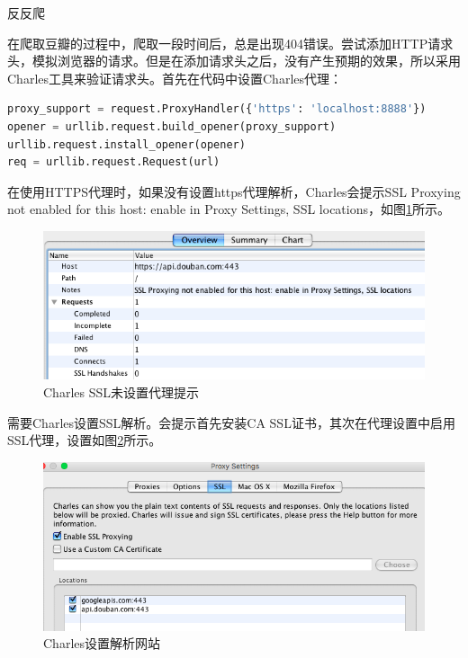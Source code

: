\documentclass[8pt]{book}
\makeatletter
\numberwithin{dummy}{section}
\theoremstyle{ocrenumbox}
\theoremstyle{blacknumex}
\theoremstyle{blacknumbox}
\theoremstyle{ocrenum}
\renewcommand{\subsection}{\@startsection {subsection}{2}{\z@}
	{-3ex \@plus -0.1ex \@minus -.4ex}
	{0.5ex \@plus.2ex }
	{\normalfont\sffamily\bfseries}}
\newlength\esp
\makeatother
\begin{document}
\subsection{反反爬}

在爬取豆瓣的过程中，爬取一段时间后，总是出现404错误。尝试添加HTTP请求头，模拟浏览器的请求。但是在添加请求头之后，没有产生预期的效果，所以采用Charles工具来验证请求头。首先在代码中设置Charles代理：

\begin{lstlisting}[language=Python]
proxy_support = request.ProxyHandler({'https': 'localhost:8888'})
opener = urllib.request.build_opener(proxy_support)
urllib.request.install_opener(opener)
req = urllib.request.Request(url)
\end{lstlisting}

在使用HTTPS代理时，如果没有设置https代理解析，Charles会提示SSL Proxying not enabled for this host: enable in Proxy Settings, SSL locations，如图\ref{fig:charlesssltips}所示。

\begin{figure}[htbp]
	\centering
	\includegraphics[scale=0.6]{charlesssltips.png}
	\caption{Charles SSL未设置代理提示}
	\label{fig:charlesssltips}
\end{figure}

需要Charles设置SSL解析。会提示首先安装CA SSL证书，其次在代理设置中启用SSL代理，设置如图\ref{fig:httpcharlesparse}所示。

\begin{figure}[htbp]
	\centering
	\includegraphics[scale=0.5]{httpcharlesparse.png}
	\caption{Charles设置解析网站}
	\label{fig:httpcharlesparse}
\end{figure}
\end{document}
